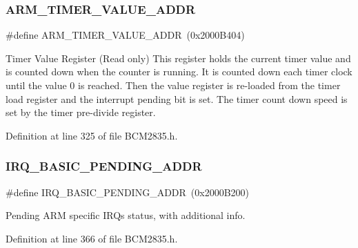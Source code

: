 \subsubsection{\texorpdfstring{A\+R\+M\+\_\+\+T\+I\+M\+E\+R\+\_\+\+V\+A\+L\+U\+E\+\_\+\+A\+D\+DR}{ARM\_TIMER\_VALUE\_ADDR}}
{\footnotesize\ttfamily \#define A\+R\+M\+\_\+\+T\+I\+M\+E\+R\+\_\+\+V\+A\+L\+U\+E\+\_\+\+A\+D\+DR~(0x2000\+B404)}



Timer Value Register (Read only) This register holds the current timer value and is counted down when the counter is running. It is counted down each timer clock until the value 0 is reached. Then the value register is re-\/loaded from the timer load register and the interrupt pending bit is set. The timer count down speed is set by the timer pre-\/divide register. 



Definition at line 325 of file B\+C\+M2835.\+h.

\mbox{\label{group__Peripherals_ga334b052c50be613285e01548f10ea332}} 
\subsubsection{\texorpdfstring{I\+R\+Q\+\_\+\+B\+A\+S\+I\+C\+\_\+\+P\+E\+N\+D\+I\+N\+G\+\_\+\+A\+D\+DR}{IRQ\_BASIC\_PENDING\_ADDR}}
{\footnotesize\ttfamily \#define I\+R\+Q\+\_\+\+B\+A\+S\+I\+C\+\_\+\+P\+E\+N\+D\+I\+N\+G\+\_\+\+A\+D\+DR~(0x2000\+B200)}



Pending A\+RM specific I\+R\+Qs status, with additional info. 



Definition at line 366 of file B\+C\+M2835.\+h.

\mbox{\label{group__Peripherals_ga733b1f250b79a62906eca0763189fc79}} 
